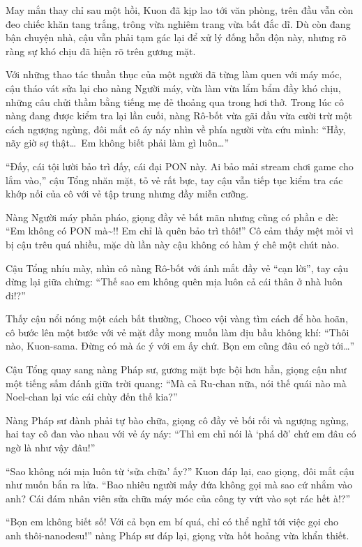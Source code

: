 \documentclass[../main.tex]{subfiles}
\begin{document}
\ct

May mắn thay chỉ sau một hồi, Kuon đã kịp lao tới văn phòng, trên đầu vẫn còn đeo chiếc khăn tang trắng, trông vừa nghiêm trang vừa bất đắc dĩ. Dù còn đang bận chuyện nhà, cậu vẫn phải tạm gác lại để xử lý đống hỗn độn này, nhưng rõ ràng sự khó chịu đã hiện rõ trên gương mặt.

Với những thao tác thuần thục của một người đã từng làm quen với máy móc, cậu tháo vát sửa lại cho nàng Người máy, vừa làm vừa lẩm bẩm đầy khó chịu, những câu chửi thầm bằng tiếng mẹ đẻ thoảng qua trong hơi thở. Trong lúc cô nàng đang được kiểm tra lại lần cuối, nàng Rô-bốt vừa gãi đầu vừa cười trừ một cách ngượng ngùng, đôi mắt cô áy náy nhìn về phía người vừa cứu mình: ``Hầy, nãy giờ sợ thật\dots\ Em không biết phải làm gì luôn\dots''

``Đấy, cái tội lười bảo trì đấy, cái đại PON này. Ai bảo mải stream chơi game cho lắm vào,'' cậu Tổng nhăn mặt, tỏ vẻ rất bực, tay cậu vẫn tiếp tục kiểm tra các khớp nối của cô với vẻ tập trung nhưng đầy miễn cưỡng.

Nàng Người máy phản pháo, giọng đầy vẻ bất mãn nhưng cũng có phần e dè: ``Em không có PON mà\~{}!! Em chỉ là quên bảo trì thôi!'' Cô cảm thấy mệt mỏi vì bị cậu trêu quá nhiều, mặc dù lần này cậu không có hàm ý chê một chút nào.

Cậu Tổng nhíu mày, nhìn cô nàng Rô-bốt với ánh mắt đầy vẻ ``cạn lời'', tay cậu dừng lại giữa chừng: ``Thế sao em không quên mịa luôn cả cái thân ở nhà luôn đi!?''

Thấy cậu nổi nóng một cách bất thường, Choco vội vàng tìm cách để hòa hoãn, cô bước lên một bước với vẻ mặt đầy mong muốn làm dịu bầu không khí: ``Thôi nào, Kuon-sama. Đừng có mà ác ý với em ấy chứ. Bọn em cũng đâu có ngờ tới\dots''

Cậu Tổng quay sang nàng Pháp sư, gương mặt bực bội hơn hẳn, giọng cậu như một tiếng sấm đánh giữa trời quang: ``Mà cả Ru-chan nữa, nói thế quái nào mà Noel-chan lại vác cái chùy đến thế kia?''

Nàng Pháp sư đành phải tự bào chữa, giọng cô đầy vẻ bối rối và ngượng ngùng, hai tay cô đan vào nhau với vẻ áy náy: ``Thì em chỉ nói là `phá dỡ' chứ em đâu có ngờ là như vậy đâu!''

``Sao không nói mịa luôn từ `sửa chữa' ấy?'' Kuon đáp lại, cao giọng, đôi mắt cậu như muốn bắn ra lửa. ``Bao nhiêu người mấy đứa không gọi mà sao cứ nhắm vào anh? Cái đám nhân viên sửa chữa máy móc của công ty vứt vào sọt rác hết à!?''

``Bọn em không biết số! Với cả bọn em bí quá, chỉ có thể nghĩ tới việc gọi cho anh thôi-nanodesu!'' nàng Pháp sư đáp lại, giọng vừa hốt hoảng vừa khẩn thiết.
\end{document}
